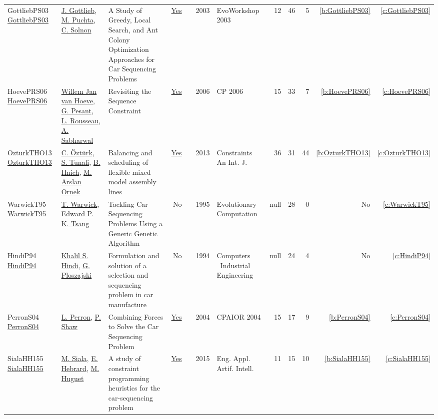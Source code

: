 {\begin{longtable}{>{\raggedright\arraybackslash}p{3cm}>{\raggedright\arraybackslash}p{6cm}>{\raggedright\arraybackslash}p{6.5cm}rrrp{2.5cm}rrrrr}
GottliebPS03 \href{https://doi.org/10.1007/3-540-36605-9_23}{GottliebPS03} & \hyperref[auth:a9]{J. Gottlieb}, \hyperref[auth:a10]{M. Puchta}, \hyperref[auth:a5]{C. Solnon} & A Study of Greedy, Local Search, and Ant Colony Optimization Approaches for Car Sequencing Problems & \href{../cars/works/GottliebPS03.pdf}{Yes} & \cite{GottliebPS03} & 2003 & EvoWorkshop 2003 & 12 & 46 & 5 & \ref{b:GottliebPS03} & \ref{c:GottliebPS03}\\
HoevePRS06 \href{https://doi.org/10.1007/11889205_44}{HoevePRS06} & \hyperref[auth:a43]{Willem Jan van Hoeve}, \hyperref[auth:a40]{G. Pesant}, \hyperref[auth:a44]{L. Rousseau}, \hyperref[auth:a42]{A. Sabharwal} & Revisiting the Sequence Constraint & \href{../cars/works/HoevePRS06.pdf}{Yes} & \cite{HoevePRS06} & 2006 & CP 2006 & 15 & 33 & 7 & \ref{b:HoevePRS06} & \ref{c:HoevePRS06}\\
OzturkTHO13 \href{https://doi.org/10.1007/s10601-013-9142-6}{OzturkTHO13} & \hyperref[auth:a14]{C. {\"{O}}zt{\"{u}}rk}, \hyperref[auth:a15]{S. Tunali}, \hyperref[auth:a16]{B. Hnich}, \hyperref[auth:a17]{M. Arslan Ornek} & Balancing and scheduling of flexible mixed model assembly lines & \href{../cars/works/OzturkTHO13.pdf}{Yes} & \cite{OzturkTHO13} & 2013 & Constraints An Int. J. & 36 & 31 & 44 & \ref{b:OzturkTHO13} & \ref{c:OzturkTHO13}\\
WarwickT95 \href{http://dx.doi.org/10.1162/evco.1995.3.3.267}{WarwickT95} & \hyperref[auth:a45]{T. Warwick}, \hyperref[auth:a46]{Edward P. K. Tsang} & Tackling Car Sequencing Problems Using a Generic Genetic Algorithm & No & \cite{WarwickT95} & 1995 & Evolutionary Computation & null & 28 & 0 & No & \ref{c:WarwickT95}\\
HindiP94 \href{http://dx.doi.org/10.1016/0360-8352(94)90038-8}{HindiP94} & \hyperref[auth:a37]{Khalil S. Hindi}, \hyperref[auth:a38]{G. Ploszajski} & Formulation and solution of a selection and sequencing problem in car manufacture & No & \cite{HindiP94} & 1994 & Computers \  Industrial Engineering & null & 24 & 4 & No & \ref{c:HindiP94}\\
PerronS04 \href{https://doi.org/10.1007/978-3-540-24664-0_16}{PerronS04} & \hyperref[auth:a20]{L. Perron}, \hyperref[auth:a21]{P. Shaw} & Combining Forces to Solve the Car Sequencing Problem & \href{../cars/works/PerronS04.pdf}{Yes} & \cite{PerronS04} & 2004 & CPAIOR 2004 & 15 & 17 & 9 & \ref{b:PerronS04} & \ref{c:PerronS04}\\
SialaHH155 \href{https://doi.org/10.1016/j.engappai.2014.10.009}{SialaHH155} & \hyperref[auth:a11]{M. Siala}, \hyperref[auth:a12]{E. Hebrard}, \hyperref[auth:a13]{M. Huguet} & A study of constraint programming heuristics for the car-sequencing problem & \href{../cars/works/SialaHH155.pdf}{Yes} & \cite{SialaHH155} & 2015 & Eng. Appl. Artif. Intell. & 11 & 15 & 10 & \ref{b:SialaHH155} & \ref{c:SialaHH155}\\

\end{longtable}}
